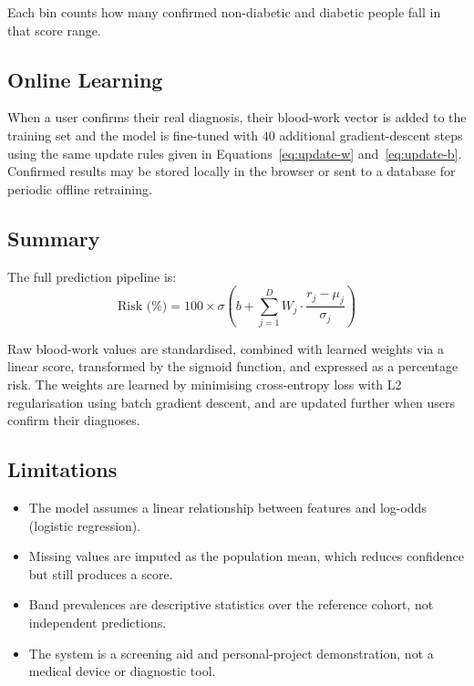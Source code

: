 Each bin counts how many confirmed non-diabetic and diabetic people fall in that score range.

\subsection{Online Learning}

When a user confirms their real diagnosis, their blood-work vector is added to the training set and the model is fine-tuned with $40$ additional gradient-descent steps using the same update rules given in Equations~\eqref{eq:update-w} and~\eqref{eq:update-b}. Confirmed results may be stored locally in the browser or sent to a database for periodic offline retraining.

\subsection{Summary}

The full prediction pipeline is:
\begin{equation}
    \boxed{\text{Risk (\%)} = 100 \times \sigma\!\left( b + \sum_{j=1}^{D} W_j \cdot \frac{r_j - \mu_j}{\sigma_j} \right)}
    \label{eq:summary}
\end{equation}

Raw blood-work values are standardised, combined with learned weights via a linear score, transformed by the sigmoid function, and expressed as a percentage risk. The weights are learned by minimising cross-entropy loss with L2 regularisation using batch gradient descent, and are updated further when users confirm their diagnoses.

\subsection{Limitations}

\begin{itemize}
    \item The model assumes a linear relationship between features and log-odds (logistic regression).
    \item Missing values are imputed as the population mean, which reduces confidence but still produces a score.
    \item Band prevalences are descriptive statistics over the reference cohort, not independent predictions.
    \item The system is a screening aid and personal-project demonstration, not a medical device or diagnostic tool.
\end{itemize}
